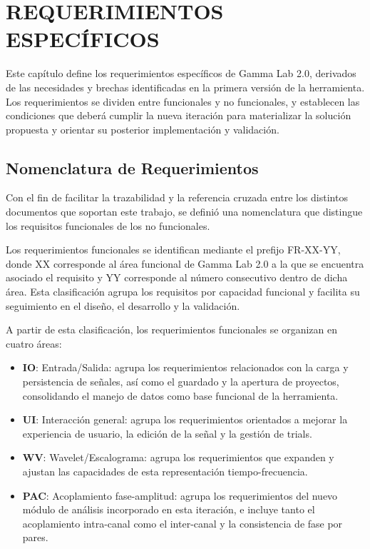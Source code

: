 \documentclass[12pt, letterpaper]{article}
\begin{document}
\newpage
\section{REQUERIMIENTOS ESPECÍFICOS}

Este capítulo define los requerimientos específicos de Gamma Lab 2.0, derivados de las necesidades y brechas identificadas en la primera versión de la herramienta. Los requerimientos se dividen entre funcionales y no funcionales, y establecen las condiciones que deberá cumplir la nueva iteración para materializar la solución propuesta y orientar su posterior implementación y validación.

\subsection{Nomenclatura de Requerimientos}
\label{sec:Nomenclatura de Requerimientos}

Con el fin de facilitar la trazabilidad y la referencia cruzada entre los distintos documentos que soportan este trabajo, se definió una nomenclatura que distingue los requisitos funcionales de los no funcionales.

Los requerimientos funcionales se identifican mediante el prefijo FR-XX-YY, donde XX corresponde al área funcional de Gamma Lab 2.0 a la que se encuentra asociado el requisito y YY corresponde al número consecutivo dentro de dicha área. Esta clasificación agrupa los requisitos por capacidad funcional y facilita su seguimiento en el diseño, el desarrollo y la validación.

A partir de esta clasificación, los requerimientos funcionales se organizan en cuatro áreas:

\begin{itemize}
    \item \textbf{IO}: Entrada/Salida: agrupa los requerimientos relacionados con la carga y persistencia de señales, así como el guardado y la apertura de proyectos, consolidando el manejo de datos como base funcional de la herramienta.
    \item \textbf{UI}: Interacción general: agrupa los requerimientos orientados a mejorar la experiencia de usuario, la edición de la señal y la gestión de trials.
    \item \textbf{WV}: Wavelet/Escalograma: agrupa los requerimientos que expanden y ajustan las capacidades de esta representación tiempo-frecuencia.
    \item \textbf{PAC}: Acoplamiento fase-amplitud: agrupa los requerimientos del nuevo módulo de análisis incorporado en esta iteración, e incluye tanto el acoplamiento intra-canal como el inter-canal y la consistencia de fase por pares.
\end{itemize}
\end{document}
